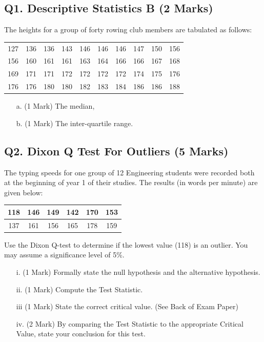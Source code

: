 \documentclass[a4paper,12pt]{article}
\begin{document}
\subsection*{Q1. Descriptive Statistics B (2 Marks)} %
The heights for a group of forty rowing club members are tabulated as follows:

\begin{table}[ht]
	\begin{center}
		\begin{tabular}{|rrrrrrrrrr|}
			
			\hline
			127& 136& 136& 143& 146& 146& 146& 147& 150& 156\\
			156& 160& 161& 161& 163& 164& 166& 166& 167& 168\\
			169& 171& 171& 172& 172& 172& 172& 174& 175& 176\\
			176& 176& 180& 180& 182& 183& 184& 186& 186& 188\\
			\hline
		\end{tabular}
	\end{center}
\end{table}
\vspace{-0.5cm}
\begin{itemize}
	\item[a.] (1 Mark) The median,
	\item[b.] (1 Mark) The inter-quartile range.
\end{itemize}

\subsection*{Q2. Dixon Q Test For Outliers (5 Marks)}

The typing speeds for one group of 12 Engineering students were recorded both at the beginning of year 1 of their studies. The results (in words per minute) are given below:

\begin{center}
	\begin{tabular}{|c|c|c|c|c|c|}
		\hline
		118 & 146 & 149 & 142 & 170& 153\\ \hline
		137 & 161 & 156 & 165&  178& 159
		\\ \hline
	\end{tabular}
\end{center}
Use the Dixon Q-test to determine if the lowest value (118) is an outlier. You may assume a significance level of 5\%.
\begin{itemize}
	\item[i.] (1 Mark) Formally state the null hypothesis and the alternative hypothesis.
	\item[ii.] (1 Mark) Compute the Test Statistic.
	\item[iii] (1 Mark) State the correct critical value. (See Back of Exam Paper)
	\item[iv.] (2 Mark) By comparing the Test Statistic to the appropriate Critical Value, state your conclusion for this test.
\end{itemize}
\end{document}

